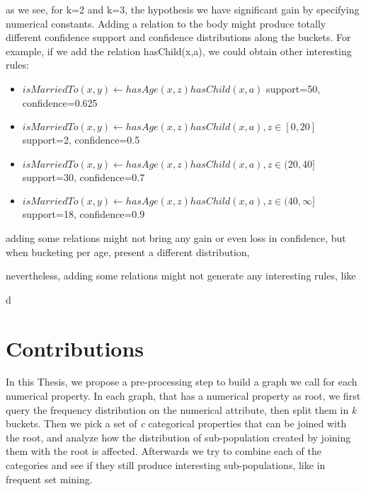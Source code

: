 as we see, for k=2 and k=3, the hypothesis we have significant gain by specifying numerical constants. Adding a relation to the body might produce totally different confidence support and confidence distributions along the buckets. For example, if we add the relation hasChild(x,a), we could obtain other interesting rules:
\begin{itemize}
 \item \begin{math}isMarriedTo(x,y) \leftarrow hasAge(x,z)hasChild(x,a)\end{math}	
    \newline support=50, confidence=0.625
 \item \begin{math}isMarriedTo(x,y) \leftarrow hasAge(x,z)hasChild(x,a), z\in[0,20]\end{math}	
    \newline support=2, confidence=0.5
 \item \begin{math}isMarriedTo(x,y) \leftarrow hasAge(x,z)hasChild(x,a), z\in(20,40]\end{math}	
    \newline support=30, confidence=0.7
 \item \begin{math}isMarriedTo(x,y) \leftarrow hasAge(x,z)hasChild(x,a), z\in(40,\infty]\end{math}	
    \newline support=18, confidence=0.9
\end{itemize}

adding some relations might not bring any gain or even loss in confidence, but when bucketing per age, present a different distribution, 

nevertheless, adding some relations might not generate any interesting rules, like 

d
\section{Contributions}
In this Thesis, we propose a pre-processing step to build a graph we call \graphname for each numerical property. In each graph, that has a numerical property as root, we first query the frequency distribution on the numerical attribute, then split them in \emph{k} buckets. Then we pick a set of \emph{c} categorical properties that can be joined with the root, and analyze how the distribution of sub-population created by joining them with the root is affected. Afterwards we try to combine each of the categories and see if they still produce interesting sub-populations, like in frequent set mining.

